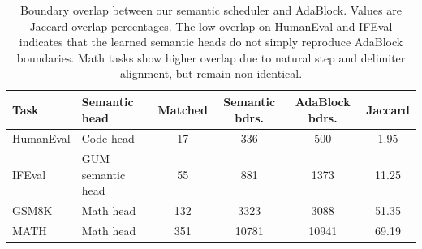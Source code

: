 \begin{table}[t]
\centering
\small
\begin{tabular}{l l c c c c}
\toprule
Task & Semantic head & Matched & Semantic bdrs. & AdaBlock bdrs. & Jaccard \\
\midrule
HumanEval & Code head & 17 & 336 & 500 & 1.95 \\
IFEval & GUM semantic head & 55 & 881 & 1373 & 11.25 \\
GSM8K & Math head & 132 & 3323 & 3088 & 51.35 \\
MATH & Math head & 351 & 10781 & 10941 & 69.19 \\
\bottomrule
\end{tabular}
\caption{Boundary overlap between our semantic scheduler and AdaBlock. Values are Jaccard overlap percentages. The low overlap on HumanEval and IFEval indicates that the learned semantic heads do not simply reproduce AdaBlock boundaries. Math tasks show higher overlap due to natural step and delimiter alignment, but remain non-identical.}
\label{tab:boundary-overlap-adablock}
\end{table}

